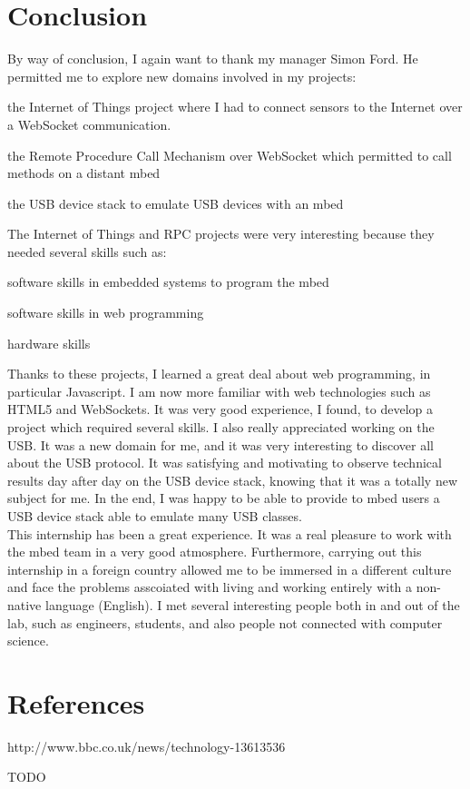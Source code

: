 \documentclass[pdftex,10pt,a4paper]{report}
\newenvironment{packed_item}{
\begin{itemize}
  \setlength{\itemsep}{1pt}
  \setlength{\parskip}{0pt}
  \setlength{\parsep}{0pt}
}{\end{itemize}}
\begin{document}
\chapter*{Conclusion}
By way of conclusion, I again want to thank my manager Simon Ford. He permitted me to explore new domains involved in my projects:
\begin{packed_item}
	\item the Internet of Things project where I had to connect sensors to the Internet over a WebSocket communication. 
	\item the Remote Procedure Call Mechanism over WebSocket which permitted to call methods on a distant mbed
	\item the USB device stack to emulate USB devices with an mbed
\end{packed_item}

The Internet of Things and RPC projects were very interesting because they needed several skills such as:
\begin{packed_item}
	\item software skills in embedded systems to program the mbed
	\item software skills in web programming
	\item hardware skills
\end{packed_item}


Thanks to these projects, I learned a great deal about web programming, in particular Javascript. I am now more familiar with web technologies such as HTML5 and WebSockets. It was very good experience, I found, to develop a project which required several skills. I also really appreciated working on the USB. It was a new domain for me, and it was very interesting to discover all about the USB protocol. It was satisfying and motivating to observe technical results day after day on the USB device stack, knowing that it was a totally new subject for me. In the end, I was happy to be able to provide to mbed users a USB device stack able to emulate many USB classes. \\


This internship has been a great experience. It was a real pleasure to work with the mbed team in a very good atmosphere. Furthermore, carrying out this
internship in a foreign country allowed me to be immersed in a different culture and face the problems asscoiated with living and working entirely with a non-native language (English). I met several
interesting people both in and out of the lab, such as engineers, students, and also people not connected with computer science.




\chapter*{References}
http://www.bbc.co.uk/news/technology-13613536

TODO
\end{document}
